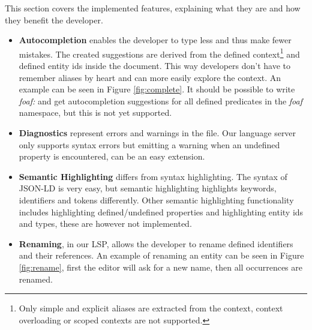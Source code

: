 \documentclass[
]{ceurart}
\begin{document}
This section covers the implemented features, explaining what they are and how they benefit the developer.

\begin{itemize}
  \item \textbf{Autocompletion} enables the developer to type less and thus make fewer mistakes.
    The created suggestions are derived from the defined context\footnote{Only simple and explicit aliases are extracted from the context, context overloading or scoped contexts are not supported.} and defined entity ids inside the document.
    This way developers don't have to remember aliases by heart and can more easily explore the context.
    An example can be seen in Figure \ref{fig:complete}.
    It should be possible to write \textit{foaf:} and get autocompletion suggestions for all defined predicates in the \textit{foaf} namespace, but this is not yet supported.
  \item \textbf{Diagnostics} represent errors and warnings in the file.
    Our language server only supports syntax errors but emitting a warning when an undefined property is encountered, can be an easy extension.
  \item \textbf{Semantic Highlighting} differs from syntax highlighting.
    The syntax of JSON-LD is very easy, but semantic highlighting highlights keywords, identifiers and tokens differently.
    Other semantic highlighting functionality includes highlighting defined/undefined properties and highlighting entity ids and types, these are however not implemented.
  \item \textbf{Renaming}, in our LSP, allows the developer to rename defined identifiers and their references.
    An example of renaming an entity can be seen in Figure \ref{fig:rename}, first the editor will ask for a new name, then all occurrences are renamed.
\end{itemize}
\end{document}
